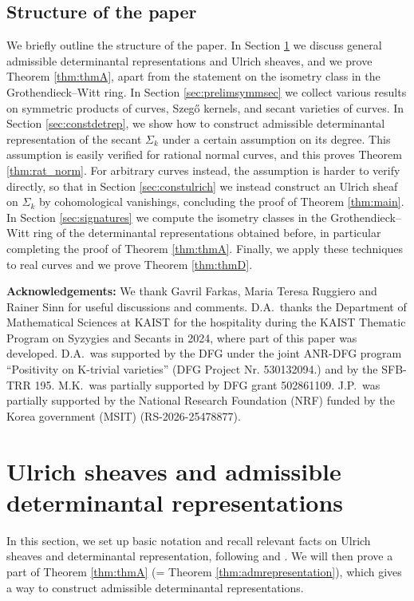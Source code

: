 \documentclass[12pt]{amsart}
\numberwithin{equation}{section}
\numberwithin{thmcounter}{section}
\theoremstyle{definition}
\theoremstyle{claim}
\begin{document}
 \subsection{Structure of the paper} We briefly outline the structure of the paper. In Section \ref{sec:prelim} we discuss general admissible determinantal representations and Ulrich sheaves, and we prove Theorem \ref{thm:thmA}, apart from the statement on the isometry class in the Grothendieck--Witt ring. In Section \ref{sec:prelimsymmsec} we collect various results on symmetric products of curves, Szeg\H{o} kernels, and
 secant varieties of curves. In Section \ref{sec:constdetrep}, we show how to construct admissible determinantal representation of the secant $\Sigma_k$ under a certain assumption on its degree. This assumption is easily verified for rational normal curves, and this proves Theorem \ref{thm:rat_norm}. For arbitrary curves instead, the assumption is harder to verify directly, so that in Section \ref{sec:constulrich} we instead construct an Ulrich sheaf  on $\Sigma_k$ by cohomological vanishings, concluding the proof of Theorem \ref{thm:main}.  In Section \ref{sec:signatures} we compute the isometry classes in the Grothendieck--Witt ring of the determinantal representations obtained before, in particular completing the proof of Theorem \ref{thm:thmA}. Finally, we apply these techniques to real curves and we prove Theorem \ref{thm:thmD}.
 \medskip
 
 \noindent
 \textbf{Acknowledgements:} We thank Gavril Farkas, Maria Teresa Ruggiero and Rainer Sinn for useful discussions and comments.
 D.A.~thanks the Department of Mathematical Sciences at KAIST for the hospitality during the KAIST Thematic Program on Syzygies and Secants in 2024, where part of this paper was developed.  D.A.~was supported by the DFG under the joint ANR-DFG program “Positivity on K-trivial varieties” (DFG Project Nr. 530132094.) and by the SFB-TRR 195.
 M.K.~was partially supported by DFG grant 502861109.
 J.P.~was partially supported by the National Research Foundation (NRF) funded by the Korea government (MSIT) (RS-2026-25478877).
 
 
 








\section{Ulrich sheaves and admissible determinantal representations}\label{sec:prelim}
\noindent In this section, we set up basic notation and recall relevant facts on Ulrich sheaves and determinantal representation, following \cite{eisenbudschreyer} and \cite{kummershamovich}. We will then prove a part of Theorem \ref{thm:thmA} (= Theorem \ref{thm:admrepresentation}), which gives a way to construct admissible determinantal representations.
\end{document}
